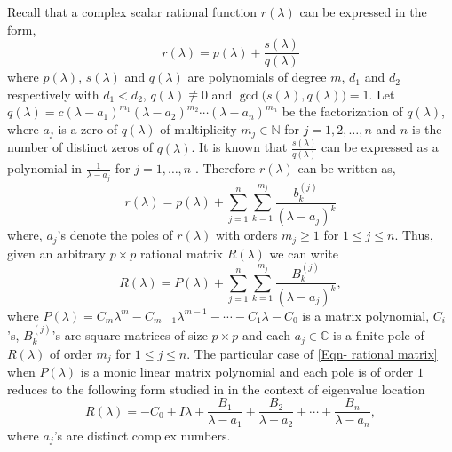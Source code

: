 \documentclass[12pt, reqno]{amsart}
\theoremstyle{definition}
\theoremstyle{remark}
\numberwithin{equation}{section}
\begin{document}
Recall that a complex scalar rational function $r(\lambda)$ can 
be expressed in the form, 
\begin{equation}\label{Eqn-scalar rational function}
\displaystyle r(\lambda) = p(\lambda) +  \frac{s(\lambda)}{q(\lambda)} 	
\end{equation}
where $p(\lambda)$, $s(\lambda)$ and $q(\lambda)$ are polynomials of degree $m$, 
$d_1$ and $d_2$ respectively with $d_1<d_2$, $q(\lambda) \not \equiv 0$ and 
$\gcd\textbf{(}s(\lambda), q(\lambda)\textbf{)} =1$. Let $q(\lambda) = 
c(\lambda-a_1)^{m_1} (\lambda-a_2)^{m_2} \cdots (\lambda-a_n)^{m_n}$ 
be the factorization of $q(\lambda)$, where $a_j$ is a zero of $q(\lambda)$ of 
multiplicity $m_j \in \mathbb{N}$ for $j=1,2,\ldots,n$ and $n$ is the number of 
distinct zeros of $q(\lambda)$. It is known that $\displaystyle 
\frac{s(\lambda)}{q(\lambda)}$ can be expressed as a polynomial in $\displaystyle 
\frac{1}{\lambda-a_j}$ for $j =1, \ldots, n$ \cite{Ponnusamy}. 
Therefore $r(\lambda)$ can be written as,
\begin{equation}\label{Eqn-scalar rational function-general form}
r(\lambda) = p(\lambda) + \displaystyle \sum_{j=1}^{n} \sum_{k=1}^{m_j} 
\frac{b_k^{(j)}}{(\lambda-a_j)^k}
\end{equation}
where, $a_j$'s denote the poles of $r(\lambda)$ with orders $m_j \geq 1$ for 
$1 \leq j \leq n$. Thus, given an arbitrary $p \times p$ rational 
matrix $R(\lambda)$ we can write 
\begin{equation}\label{Eqn- rational matrix}
R(\lambda) = P(\lambda) +\displaystyle \sum_{j=1}^{n} \sum_{k=1}^{m_j} 
\frac{B_k^{(j)}}{(\lambda-a_j)^k},
\end{equation}
where $P(\lambda)=C_m\lambda^m- C_{m-1}\lambda^{m-1} - \cdots -C_1 \lambda - C_0$ 
is a matrix polynomial, $C_i$'s, $B_k^{(j)}$'s are square matrices of size 
$p\times p$ and each $a_j \in \mathbb{C}$ is a finite pole of $R(\lambda)$ of order 
$m_j$ for $1 \leq j \leq n$. The particular case of \eqref{Eqn- rational matrix} 
when $P(\lambda)$ is a monic linear matrix polynomial and each pole is of order 
$1$ reduces to the following form studied in \cite{Hadimani-Pallavi-Jayaraman} in 
the context of eigenvalue location  
\begin{equation}\label{Eqn-rational matrix-linear}
R(\lambda) = \displaystyle -C_0 +I\lambda +\frac{B_1}{\lambda-a_1}+ 
\frac{B_2}{\lambda-a_2} + \cdots + \frac{B_n} {\lambda-a_n},
\end{equation} 
where $a_j$'s are distinct complex numbers. 
\end{document}

